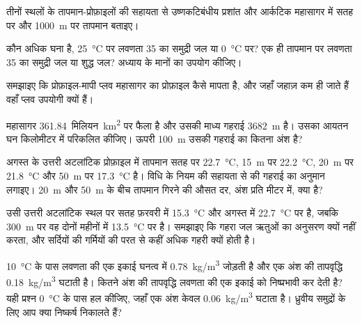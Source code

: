 \begin{exercise}[$\star$]\label{exo:g10:layered-ocean:3}
तीनों स्थलों के तापमान-प्रोफ़ाइलों की सहायता से उष्णकटिबंधीय प्रशांत और आर्कटिक
महासागर में सतह पर और \qty{1000}{m} पर तापमान
बताइए।
\end{exercise}

\begin{exercise}[$\star$]\label{exo:g10:layered-ocean:4}
कौन अधिक घना है, \qty{25}{\degreeCelsius} पर लवणता 35 का समुद्री जल या
\qty{0}{\degreeCelsius} पर? एक ही तापमान पर लवणता 35 का समुद्री जल या शुद्ध जल?
अध्याय के मानों का उपयोग कीजिए।
\end{exercise}

\begin{exercise}[$\star$]\label{exo:g10:layered-ocean:5}
समझाइए कि प्रोफ़ाइल-मापी प्लव महासागर का प्रोफ़ाइल कैसे मापता है, और जहाँ जहाज़ कम ही जाते हैं वहाँ
प्लव उपयोगी क्यों हैं।
\end{exercise}

\begin{exercise}[$\star\star$]\label{exo:g10:layered-ocean:6}
महासागर \num{361.84}~मिलियन~\unit{km^2} पर फैला है और उसकी माध्य गहराई
\qty{3682}{m} है। उसका आयतन घन किलोमीटर में परिकलित कीजिए। ऊपरी \qty{100}{m} उसकी
गहराई का कितना अंश है?
\end{exercise}

\begin{exercise}[$\star\star$]\label{exo:g10:layered-ocean:7}
अगस्त के उत्तरी अटलांटिक प्रोफ़ाइल में तापमान सतह पर
\qty{22.7}{\degreeCelsius}, \qty{15}{m} पर \qty{22.2}{\degreeCelsius},
\qty{20}{m} पर \qty{21.8}{\degreeCelsius} और
\qty{50}{m} पर \qty{17.3}{\degreeCelsius} है। विधि के नियम की सहायता से
 की गहराई का अनुमान लगाइए। \qty{20}{m} और \qty{50}{m} के बीच
तापमान गिरने की औसत दर, अंश प्रति मीटर में, क्या है?
\end{exercise}

\begin{exercise}[$\star\star$]\label{exo:g10:layered-ocean:8}
उसी उत्तरी अटलांटिक स्थल पर सतह फ़रवरी में \qty{15.3}{\degreeCelsius}
और अगस्त में \qty{22.7}{\degreeCelsius} पर है, जबकि \qty{300}{m} पर
वह दोनों महीनों में \qty{13.5}{\degreeCelsius} पर है। समझाइए कि गहरा
जल ऋतुओं का अनुसरण क्यों नहीं करता, और सर्दियों की  गर्मियों की परत से
कहीं अधिक गहरी क्यों होती है।
\end{exercise}

\begin{exercise}[$\star\star$]\label{exo:g10:layered-ocean:9}
\qty{10}{\degreeCelsius} के पास लवणता की एक इकाई घनत्व में
\qty{0.78}{kg/m^3} जोड़ती है और एक अंश की तापवृद्धि
\qty{0.18}{kg/m^3} घटाती है। कितने अंश की तापवृद्धि लवणता की एक इकाई को
निष्प्रभावी कर देती है? यही प्रश्न \qty{0}{\degreeCelsius} के पास हल कीजिए, जहाँ एक
अंश केवल \qty{0.06}{kg/m^3} घटाता है। ध्रुवीय समुद्रों के लिए
आप क्या निष्कर्ष निकालते हैं?
\end{exercise}


